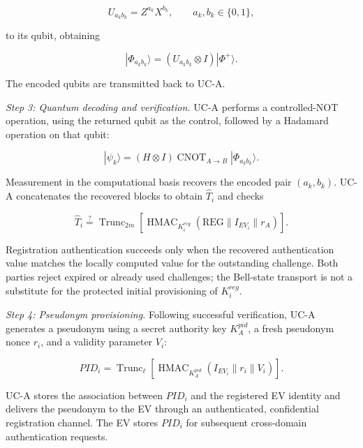 \documentclass[twocolumn,10pt,journal]{IEEEtran}
\begin{document}
\begin{equation}
U_{a_kb_k}=Z^{a_k}X^{b_k},
\qquad a_k,b_k\in\{0,1\},
\label{eq:ev_reg_pauli}
\end{equation}

to its qubit, obtaining

\begin{equation}
|\Phi_{a_kb_k}\rangle
=
(U_{a_kb_k}\otimes I)
|\Phi^{+}\rangle.
\label{eq:ev_reg_encoded}
\end{equation}

The encoded qubits are transmitted back to UC-A.

\textit{Step 3: Quantum decoding and verification.}
UC-A performs a controlled-NOT operation, using
the returned qubit as the control, followed by a
Hadamard operation on that qubit:

\begin{equation}
|\psi_k\rangle
=
(H\otimes I)
\operatorname{CNOT}_{A\rightarrow B}
|\Phi_{a_kb_k}\rangle.
\label{eq:ev_reg_decode}
\end{equation}

Measurement in the computational basis recovers
the encoded pair $(a_k,b_k)$. UC-A concatenates the
recovered blocks to obtain $\widehat{T}_i$ and checks

\begin{equation}
\widehat{T}_i
\stackrel{?}{=}
\operatorname{Trunc}_{2m}
\left[
\operatorname{HMAC}_{K_i^{reg}}
\left(
\mathrm{REG}\parallel I_{EV_i}\parallel r_A
\right)
\right].
\label{eq:ev_reg_verify}
\end{equation}

Registration authentication succeeds only when
the recovered authentication value matches the
locally computed value for the outstanding challenge.
Both parties reject expired or already used challenges; the
Bell-state transport is not a substitute for the protected
initial provisioning of $K_i^{reg}$.

\textit{Step 4: Pseudonym provisioning.}
Following successful verification, UC-A generates
a pseudonym using a secret authority key $K_A^{pid}$,
a fresh pseudonym nonce $r_i$, and a validity
parameter $V_i$:

\begin{equation}
PID_i =
\operatorname{Trunc}_{\ell}
\left[
\operatorname{HMAC}_{K_A^{pid}}
\left(
I_{EV_i}\parallel r_i\parallel V_i
\right)
\right].
\label{eq:ev_reg_pid}
\end{equation}

UC-A stores the association between $PID_i$ and
the registered EV identity and delivers the
pseudonym to the EV through an authenticated,
confidential registration channel. The EV stores
$PID_i$ for subsequent cross-domain authentication
requests.
\end{document}
